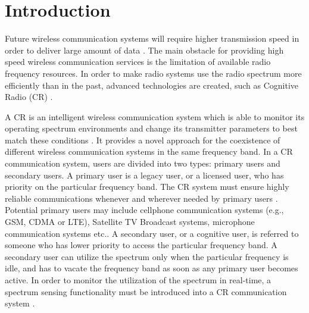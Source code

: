 \chapter{Introduction}
Future wireless communication systems will require higher transmission speed in order to deliver large amount of data \cite{pelcat20133gpp}. The main obstacle for providing high speed wireless communication services is the limitation of available radio frequency resources. In order to make radio systems use the radio spectrum more efficiently than in the past, advanced technologies are created, such as Cognitive Radio (CR) \cite{federal2005notice}. 

A CR is an intelligent wireless communication system which is able to monitor its operating spectrum environments and change its transmitter parameters to best match these conditions \cite{wang2011advances, a001}. It provides a novel approach for the coexistence of different wireless communication systems in the same frequency band. In a CR communication system, users are divided into two types: primary users and secondary users. A primary user is a legacy user, or a licensed user, who has priority on the particular frequency band. The CR system must ensure highly reliable communications whenever and wherever needed by primary users \cite{a001}. Potential primary users may include cellphone communication systems (e.g., GSM, CDMA or LTE), Satellite TV Broadcast systems, microphone communication systems etc.. A secondary user, or a cognitive user, is referred to someone who has lower priority to access the particular frequency band. A secondary user can utilize the spectrum only when the particular frequency is idle, and has to vacate the frequency band as soon as any primary user becomes active. 
In order to monitor the utilization of the spectrum in real-time, a spectrum sensing functionality must be introduced into a CR communication system \cite{buddhikot2007understanding, tandra2009spectrum}.   

